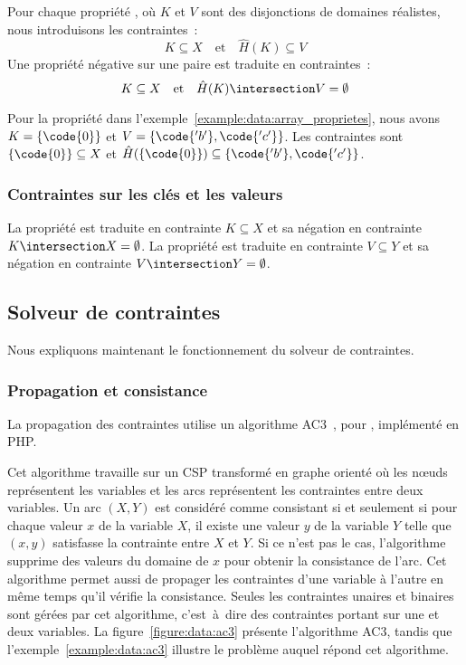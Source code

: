 Pour chaque propriété , où $K$ et $V$ sont des disjonctions de
domaines réalistes, nous introduisons les contraintes~:
%
$$K \subseteq X \quad\mathrm{et}\quad \hat{H}(K) \subseteq V$$
%
Une propriété négative sur une paire  est traduite en
contraintes~:
%
$$K \subseteq X \quad\mathrm{et}\quad \hat{H}(K) \intersection V = \emptyset$$

Pour la propriété  dans
l'exemple~\ref{example:data:array_proprietes}, nous avons $K = \{\code{0}\}$ et
$V = \{\code{'b'}, \code{'c'}\}$. Les contraintes sont $\{\code{0}\} \subseteq
X$ et $\hat{H}(\{\code{0}\}) \subseteq \{\code{'b'}, \code{'c'}\}$.

\subsubsection{Contraintes sur les clés et les valeurs}

La propriété  est traduite en contrainte $K \subseteq X$ et sa
négation  en contrainte $K \intersection X = \emptyset$. La
propriété  est traduite en contrainte $V \subseteq Y$ et sa
négation  en contrainte $V \intersection Y = \emptyset$.

\subsection{Solveur de contraintes}

Nous expliquons maintenant le fonctionnement du solveur de contraintes.

\subsubsection{Propagation et consistance}

La propagation des contraintes utilise un algorithme AC3~,
pour , implémenté en PHP.

Cet algorithme travaille sur un CSP transformé en graphe orienté où les nœuds
représentent les variables et les arcs représentent les contraintes entre deux
variables. Un arc $(X, Y)$ est considéré comme consistant si et seulement si
pour chaque valeur $x$ de la variable $X$, il existe une valeur $y$ de la
variable $Y$ telle que $(x, y)$ satisfasse la contrainte entre $X$ et $Y$.  Si
ce n'est pas le cas, l'algorithme supprime des valeurs du domaine de $x$ pour
obtenir la consistance de l'arc. Cet algorithme permet aussi de propager les
contraintes d'une variable à l'autre en même temps qu'il vérifie la consistance.
Seules les contraintes unaires et binaires sont gérées par cet algorithme,
c'est~à~dire des contraintes portant sur une et deux variables. La
figure~\ref{figure:data:ac3} présente l'algorithme AC3, tandis que
l'exemple~\ref{example:data:ac3} illustre le problème auquel répond cet
algorithme.

